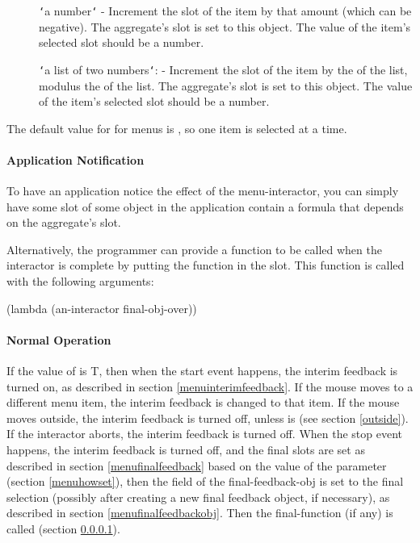 \begin{description}
\item[] {\tt\char`\<}a number{\tt\char`\>} 
- Increment the  slot of the item by that amount
(which can be negative).  The aggregate's  slot is set to
this object.  The value of the item's selected slot should be a number.

\item[] {\tt\char`\<}a list of two numbers{\tt\char`\>}:  - Increment the
 slot of the item by the  of the list, modulus the
 of the list.  The aggregate's  slot is set to
this object.  The value of the item's selected slot should be a number.
\end{description}

The default value for  for menus is , so one item is
selected at a time.

\paragraph{Application Notification}
\label{menufinalfunc}
To have an application notice the effect of the menu-interactor, you can
simply have some slot of some object in the application contain a formula
that depends on the aggregate's  slot.

Alternatively, the programmer can provide a function to be called when the
interactor is complete by putting the function in the 
slot.  This function is called with the following arguments:
\begin{programexample}
(lambda (an-interactor final-obj-over))
\end{programexample}

\paragraph{Normal Operation}

If the value of  is T,
then when the start event happens, the interim feedback is turned on, as
described in section \ref{menuinterimfeedback}.  If the mouse moves to a
different menu item, the interim feedback is changed to that item.  If the
mouse moves outside, the interim feedback is turned off, unless  is
 (see section \ref{outside}).  If the interactor
aborts, the interim feedback is turned off.  When the stop event happens, the
interim feedback is turned off, and the final  slots are set
as described in section \ref{menufinalfeedback} based on the value of the
 parameter (section \ref{menuhowset}), then the 
field of the final-feedback-obj is set to the final selection (possibly
after creating a new final feedback object, if necessary), as described in
section \ref{menufinalfeedbackobj}.  Then the final-function
(if any) is called (section \ref{menufinalfunc}).

